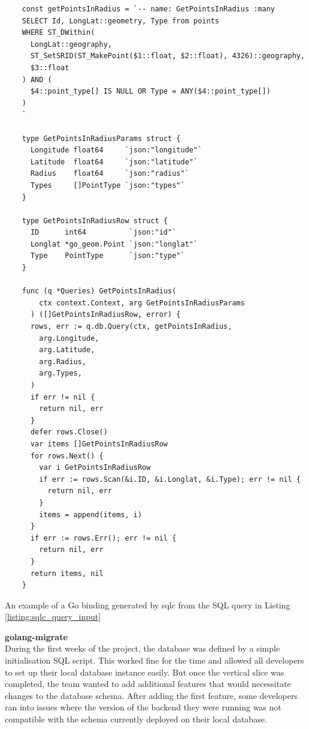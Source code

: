 \begin{listing}[htbp]
  \centering{}
  \begin{minipage}{0.85\textwidth}
  \begin{verbatim}
    const getPointsInRadius = `-- name: GetPointsInRadius :many
    SELECT Id, LongLat::geometry, Type from points
    WHERE ST_DWithin(
      LongLat::geography,
      ST_SetSRID(ST_MakePoint($1::float, $2::float), 4326)::geography,
      $3::float
    ) AND (
      $4::point_type[] IS NULL OR Type = ANY($4::point_type[])
    )
    `

    type GetPointsInRadiusParams struct {
      Longitude float64     `json:"longitude"`
      Latitude  float64     `json:"latitude"`
      Radius    float64     `json:"radius"`
      Types     []PointType `json:"types"`
    }

    type GetPointsInRadiusRow struct {
      ID      int64          `json:"id"`
      Longlat *go_geom.Point `json:"longlat"`
      Type    PointType      `json:"type"`
    }

    func (q *Queries) GetPointsInRadius(
        ctx context.Context, arg GetPointsInRadiusParams
      ) ([]GetPointsInRadiusRow, error) {
      rows, err := q.db.Query(ctx, getPointsInRadius,
        arg.Longitude,
        arg.Latitude,
        arg.Radius,
        arg.Types,
      )
      if err != nil {
        return nil, err
      }
      defer rows.Close()
      var items []GetPointsInRadiusRow
      for rows.Next() {
        var i GetPointsInRadiusRow
        if err := rows.Scan(&i.ID, &i.Longlat, &i.Type); err != nil {
          return nil, err
        }
        items = append(items, i)
      }
      if err := rows.Err(); err != nil {
        return nil, err
      }
      return items, nil
    }
  \end{verbatim}
  \end{minipage}
  \caption{An example of a Go binding generated by sqlc from the SQL query in
  Listing \ref{listing:sqlc_query_input}}
  \label{listing:sqlc_generated_bindings}
\end{listing}

\textbf{golang-migrate}\\
During the first weeks of the project, the database was defined by a simple
initialisation SQL script. This worked fine for the time and allowed all
developers to set up their local database instance easily. But once the vertical
slice was completed, the team wanted to add additional features that would
necessitate changes to the database schema. After adding the first feature, some
developers ran into issues where the version of the backend they were running
was not compatible with the schema currently deployed on their local database.

